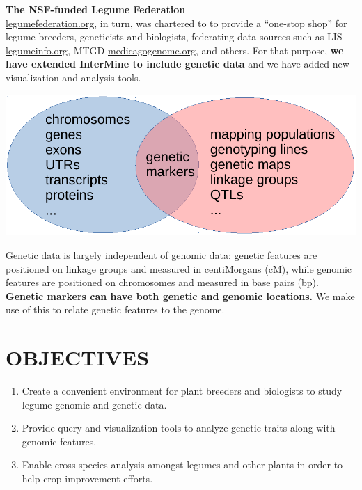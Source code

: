 \documentclass[]{pagposter}
\newlength{\figwidth}
\begin{document}
\begin{multicols*}{3}
  \textbf{The NSF-funded Legume Federation} \\
  \url{legumefederation.org}, in turn, was chartered to to provide a ``one-stop shop'' for legume breeders, geneticists and biologists,
  federating data sources such as LIS \url{legumeinfo.org}, MTGD \url{medicagogenome.org}, and others.
  For that purpose, \textbf{we have extended InterMine to include genetic data} and we have added new visualization and analysis tools.

  \begin{center}
    \includegraphics[width=\figwidth]{genetics-genomics-venn.pdf} %
  \end{center}

  Genetic data is largely independent of genomic data: genetic features are positioned on linkage groups and measured in centiMorgans (cM), while genomic features are positioned on chromosomes and measured in base pairs (bp).
  \textbf{Genetic markers can have both genetic and genomic locations.} We make use of this to relate genetic features to the genome.


  \section*{OBJECTIVES}
  
  \begin{enumerate}
  \item Create a convenient environment for plant breeders and biologists to study legume genomic and genetic data.
  \item Provide query and visualization tools to analyze genetic traits along with genomic features.
  \item Enable cross-species analysis amongst legumes and other plants in order to help crop improvement efforts.
  \end{enumerate}


\end{multicols*}
\end{document}
